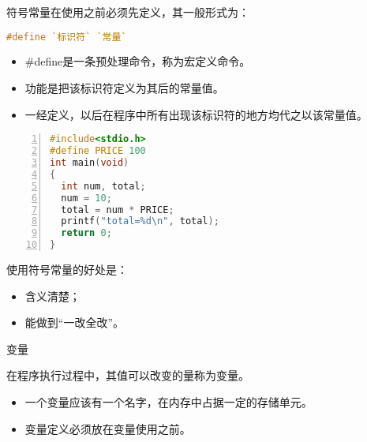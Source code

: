 \begin{frame}[fragile]
符号常量在使用之前必须先定义，其一般形式为：
\begin{lstlisting}[language=C]
#define `标识符` `常量`
\end{lstlisting}
\vspace{0.05in}

\begin{itemize}
\item \#define是一条预处理命令，称为宏定义命令。\\[0.1in]
\item 功能是把该标识符定义为其后的常量值。\\[0.1in]
\item 一经定义，以后在程序中所有出现该标识符的地方均代之以该常量值。
\end{itemize}
\end{frame}

\begin{frame}[fragile]
\begin{lstlisting}[language=c,title=price.c,frame=single,numbers=left]
#include<stdio.h>
#define PRICE 100
int main(void)
{
  int num, total;  
  num = 10;
  total = num * PRICE;
  printf("total=%d\n", total);  
  return 0;
}
\end{lstlisting}

\end{frame}

\begin{frame}[fragile]
使用符号常量的好处是：\vspace{0.05in}

\begin{itemize}
\item 含义清楚；\\[0.1in]
\item 能做到“一改全改”。
\end{itemize}
\end{frame}


\begin{frame}
\begin{dingyi}\textcolor{acolor3}{变量}

在程序执行过程中，其值可以改变的量称为变量。
\end{dingyi}

\begin{itemize}
\item
一个变量应该有一个名字，在内存中占据一定的存储单元。\\[0.1in]
\item
变量定义必须放在变量使用之前。
\end{itemize}
\end{frame}


